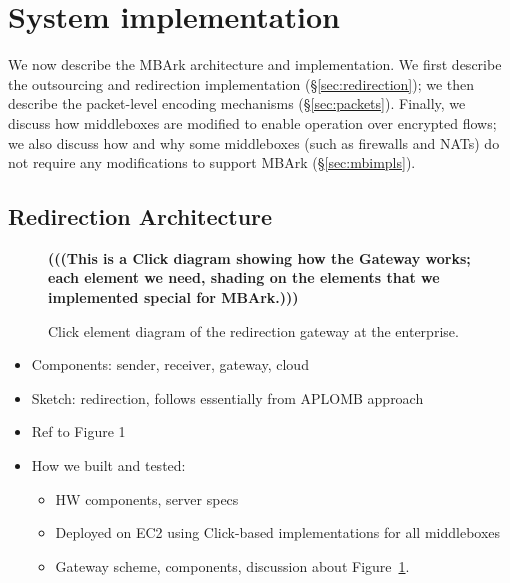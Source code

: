 
\section{System implementation} \label{sec:impl}

We now describe the MBArk architecture and implementation. 
We first describe the outsourcing and redirection implementation (\S\ref{sec:redirection}); we then describe the packet-level encoding mechanisms (\S\ref{sec:packets}).
Finally, we discuss how middleboxes are modified to enable operation over encrypted flows; we also discuss how and why some middleboxes (such as firewalls and NATs) do not require any modifications to support MBArk (\S\ref{sec:mbimpls}).

\subsection{Redirection Architecture}

\begin{figure}[t]
  {\bf (((This is a Click diagram showing how the Gateway works; each element we need, shading
  on the elements that we implemented special for MBArk.)))}
  \caption[]{\label{fig:gateway}Click element diagram of the redirection gateway at the enterprise.}
\end{figure}

\begin{itemize}
  \item Components: sender, receiver, gateway, cloud
  \item Sketch: redirection, follows essentially from APLOMB approach
  \item Ref to Figure 1
  \item How we built and tested:
    \begin{itemize}
      \item HW components, server specs
      \item Deployed on EC2 using Click-based implementations for all middleboxes
      \item Gateway scheme, components, discussion about Figure~\ref{fig:gateway}.
    \end{itemize}
\end{itemize}

